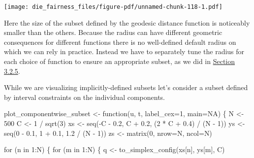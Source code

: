 \documentclass[
  letterpaper,
  DIV=11,
  numbers=noendperiod]{scrartcl}
\newenvironment{Shaded}{\begin{snugshade}}{\end{snugshade}}
\newcommand{\AttributeTok}[1]{\textcolor[rgb]{0.40,0.45,0.13}{#1}}
\newcommand{\ConstantTok}[1]{\textcolor[rgb]{0.56,0.35,0.01}{#1}}
\newcommand{\ControlFlowTok}[1]{\textcolor[rgb]{0.00,0.23,0.31}{#1}}
\newcommand{\DecValTok}[1]{\textcolor[rgb]{0.68,0.00,0.00}{#1}}
\newcommand{\FloatTok}[1]{\textcolor[rgb]{0.68,0.00,0.00}{#1}}
\newcommand{\FunctionTok}[1]{\textcolor[rgb]{0.28,0.35,0.67}{#1}}
\newcommand{\NormalTok}[1]{\textcolor[rgb]{0.00,0.23,0.31}{#1}}
\newcommand{\OtherTok}[1]{\textcolor[rgb]{0.00,0.23,0.31}{#1}}
\newcommand{\SpecialCharTok}[1]{\textcolor[rgb]{0.37,0.37,0.37}{#1}}
\begin{document}
\texttt{[image: die\_fairness\_files/figure-pdf/unnamed-chunk-118-1.pdf]}

Here the size of the subset defined by the geodesic distance function is
noticeably smaller than the others. Because the radius can have
different geometric consequences for different functions there is no
well-defined default radius on which we can rely in practice. Instead we
have to separately tune the radius for each choice of function to ensure
an appropriate subset, as we did in \href{@sec:effective_direct}{Section
3.2.5}.

While we are visualizing implicitly-defined subsets let's consider a
subset defined by interval constraints on the individual components.

\begin{Shaded}
\begin{Highlighting}[]
\NormalTok{plot\_componentwise\_subset }\OtherTok{\textless{}{-}} \ControlFlowTok{function}\NormalTok{(u, t, }\AttributeTok{label\_cex=}\DecValTok{1}\NormalTok{, }\AttributeTok{main=}\ConstantTok{NA}\NormalTok{) \{}
\NormalTok{  N }\OtherTok{\textless{}{-}} \DecValTok{500}
\NormalTok{  C }\OtherTok{\textless{}{-}} \DecValTok{1} \SpecialCharTok{/} \FunctionTok{sqrt}\NormalTok{(}\DecValTok{3}\NormalTok{)}
\NormalTok{  xs }\OtherTok{\textless{}{-}} \FunctionTok{seq}\NormalTok{(}\SpecialCharTok{{-}}\NormalTok{C }\SpecialCharTok{{-}} \FloatTok{0.2}\NormalTok{, C }\SpecialCharTok{+} \FloatTok{0.2}\NormalTok{, (}\DecValTok{2} \SpecialCharTok{*}\NormalTok{ C }\SpecialCharTok{+} \FloatTok{0.4}\NormalTok{) }\SpecialCharTok{/}\NormalTok{ (N }\SpecialCharTok{{-}} \DecValTok{1}\NormalTok{))}
\NormalTok{  ys }\OtherTok{\textless{}{-}} \FunctionTok{seq}\NormalTok{(}\DecValTok{0} \SpecialCharTok{{-}} \FloatTok{0.1}\NormalTok{, }\DecValTok{1} \SpecialCharTok{+} \FloatTok{0.1}\NormalTok{, }\FloatTok{1.2} \SpecialCharTok{/}\NormalTok{ (N }\SpecialCharTok{{-}} \DecValTok{1}\NormalTok{))}
\NormalTok{  zs }\OtherTok{\textless{}{-}} \FunctionTok{matrix}\NormalTok{(}\DecValTok{0}\NormalTok{, }\AttributeTok{nrow=}\NormalTok{N, }\AttributeTok{ncol=}\NormalTok{N)}

  \ControlFlowTok{for}\NormalTok{ (n }\ControlFlowTok{in} \DecValTok{1}\SpecialCharTok{:}\NormalTok{N) \{}
    \ControlFlowTok{for}\NormalTok{ (m }\ControlFlowTok{in} \DecValTok{1}\SpecialCharTok{:}\NormalTok{N) \{}
\NormalTok{      q }\OtherTok{\textless{}{-}} \FunctionTok{to\_simplex\_config}\NormalTok{(xs[n], ys[m], C)}


\end{Highlighting}
\end{Shaded}
\end{document}
